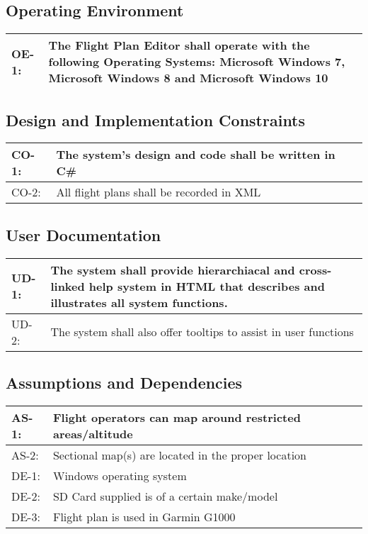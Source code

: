 \documentclass[12pt, letterpaper]{article}
\begin{document}
  \subsection{Operating Environment}
    \begin{tabularx}{\textwidth}{|l|X|}
      \hline
      OE-1: & The Flight Plan Editor shall operate with the following Operating Systems:
              Microsoft Windows 7, Microsoft Windows 8 and Microsoft Windows 10\\
      \hline
    \end{tabularx}
  \subsection{Design and Implementation Constraints}
    \begin{tabularx}{\textwidth}{|l|X|}
      \hline
      CO-1: & The system's design and code shall be written in C\# \\ \hline
      CO-2: & All flight plans shall be recorded in XML\\
      \hline
    \end{tabularx}
  \subsection{User Documentation}
    \begin{tabularx}{\textwidth}{|l|X|}
      \hline
      UD-1: & The system shall provide hierarchiacal and cross-linked help system in HTML that
              describes and illustrates all system functions.\\ \hline
      UD-2: & The system shall also offer tooltips to assist in user functions \\
      \hline
    \end{tabularx}
  \subsection{Assumptions and Dependencies}
    \begin{tabularx}{\textwidth}{|l|X|}
      \hline
      AS-1: & Flight operators can map around restricted areas/altitude\\ \hline
      AS-2: & Sectional map(s) are located in the proper location\\ \hline
      DE-1: & Windows operating system\\ \hline
      DE-2: & SD Card supplied is of a certain make/model\\ \hline
      DE-3: & Flight plan is used in Garmin G1000\\ \hline
      \hline
    \end{tabularx}
\end{document}
